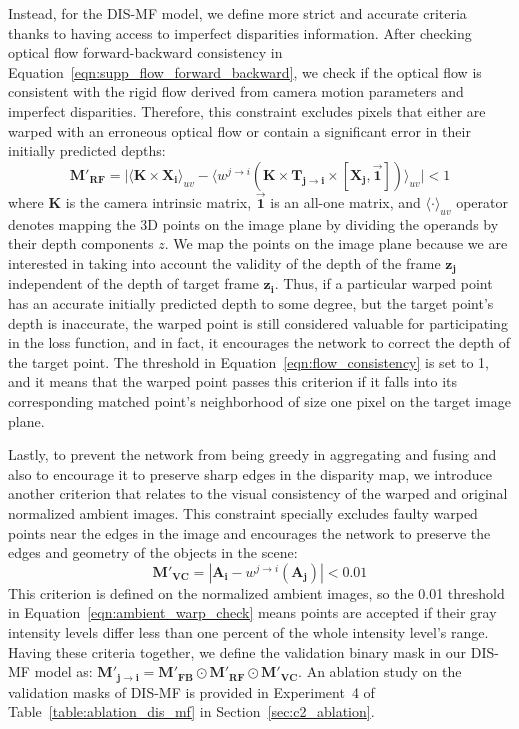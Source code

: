 Instead, for the DIS-MF model, we define more strict and accurate criteria thanks to having access to imperfect disparities information. After checking optical flow forward-backward consistency in Equation~\eqref{eqn:supp_flow_forward_backward}, we check if the optical flow is consistent with the rigid flow derived from camera motion parameters and imperfect disparities. Therefore, this constraint excludes pixels that either are warped with an erroneous optical flow or contain a significant error in their initially predicted depths:
\begin{equation}\label{eqn:flow_consistency}
    \boldsymbol{M'_{RF}} = \Big|\langle \boldsymbol{K} \times \boldsymbol{X_{i}}\rangle_{uv} - \big\langle w^{j \rightarrow i}
    (\boldsymbol{K} \times \boldsymbol{T_{j \rightarrow i}} \times [\boldsymbol{X_{j}},\vec{\mathbf{1}}])\big\rangle_{uv}   \Big| < 1
\end{equation}
where $\boldsymbol{K}$ is the camera intrinsic matrix, $\vec{\mathbf{1}}$ is an all-one matrix, and $\langle\cdot\rangle_{uv}$ operator denotes mapping the 3D points on the image plane by dividing the operands by their depth components $z$. We map the points on the image plane because we are interested in taking into account the validity of the depth of the frame $\boldsymbol{z_j}$ independent of the depth of target frame $\boldsymbol{z_i}$. Thus, if a particular warped point has an accurate initially predicted depth to some degree, but the target point's depth is inaccurate, the warped point is still considered valuable for participating in the loss function, and in fact, it encourages the network to correct the depth of the target point. The threshold in Equation~\eqref{eqn:flow_consistency} is set to 1, and it means that the warped point passes this criterion if it falls into its corresponding matched point's neighborhood of size one pixel on the target image plane.

Lastly, to prevent the network from being greedy in aggregating and fusing and also to encourage it to preserve sharp edges in the disparity map, we introduce another criterion that relates to the visual consistency of the warped and original normalized ambient images. This constraint specially excludes faulty warped points near the edges in the image and encourages the network to preserve the edges and geometry of the objects in the scene:
\begin{equation}\label{eqn:ambient_warp_check}
    \boldsymbol{M'_{VC}} = |\boldsymbol{A_{i}} - w^{j \rightarrow i}(\boldsymbol{A_{j}})|< 0.01
\end{equation}
This criterion is defined on the normalized ambient images, so the 0.01 threshold in Equation~\eqref{eqn:ambient_warp_check} means points are accepted if their gray intensity levels differ less than one percent of the whole intensity level's range. Having these criteria together, we define the validation binary mask in our DIS-MF model as: $\boldsymbol{M'_{j \rightarrow i}} = \boldsymbol{M'_{FB}} \odot \boldsymbol{M'_{RF}} \odot \boldsymbol{M'_{VC}}$. An ablation study on the validation masks of DIS-MF is provided in Experiment~4 of Table~\ref{table:ablation_dis_mf} in Section~\ref{sec:c2_ablation}.

